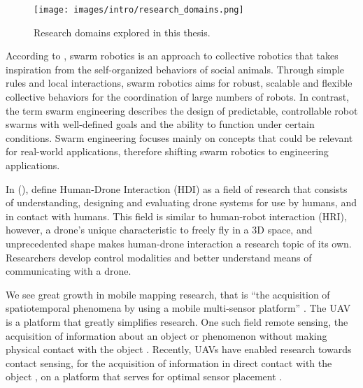 \begin{figure}[!h]
  \raggedright
  \texttt{[image: images/intro/research\_domains.png]}
  \caption{Research domains explored in this thesis.} 
  \label{fig:research_domains}
\end{figure}

According to  \cite{swarm_review}, swarm robotics is an approach to collective robotics that takes inspiration from the self-organized behaviors of social animals. Through simple rules and local interactions, swarm robotics aims for robust, scalable and flexible collective behaviors for the coordination of large numbers of robots. In contrast, the term swarm engineering \cite{swarm_engineering} describes the design of predictable, controllable robot swarms with well-defined goals and the ability to function under certain conditions. Swarm engineering focuses mainly on concepts that could be relevant for real-world applications, therefore shifting swarm robotics to engineering applications. 

In  (\citeyear{tezza_andujar_2019}),  define Human-Drone Interaction (HDI) as a field of research that consists of understanding, designing and evaluating drone systems for use by humans, and in contact with humans. This field is similar to human-robot interaction (HRI), however, a drone’s unique characteristic to freely fly in a 3D space, and unprecedented shape makes human-drone interaction a research topic of its own. Researchers develop control modalities and better understand means of communicating with a drone.

We see great growth in mobile mapping research, that is “the acquisition of spatiotemporal phenomena by using a mobile multi-sensor platform” \cite{mobile_mapping}. The UAV is a platform that greatly simplifies research. One such field remote sensing, the acquisition of information about an object or phenomenon without making physical contact with the object \cite{remote_sensing}. Recently, UAVs have enabled research towards contact sensing, for the acquisition of information in direct contact with the object \cite{sensor_placement_uav}, on a platform that serves for optimal sensor placement \cite{sensor_placement_uav} \cite{stewart_chang_sudarchan_becker_huang_2016}.


